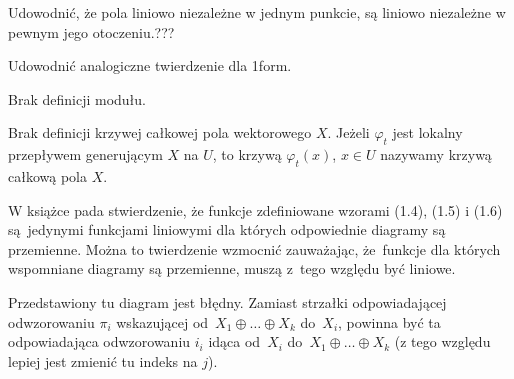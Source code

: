 \documentclass[a4paper,11pt]{article}
\begin{document}




\vspace{\spaceTwo} \vspace{\spaceThree}



\noi {} \Dok \start Udowodnić, że pola liniowo
niezależne w jednym punkcie, są liniowo niezależne w pewnym jego
otoczeniu.???

\vspace{\spaceFour}


\start Udowodnić analogiczne twierdzenie dla 1\dywiz form.

\vspace{\spaceFour}


\start Brak definicji modułu.

\vspace{\spaceFour}


\start Brak definicji krzywej całkowej pola wektorowego $X$. Jeżeli
$\varphi_{ t }$ jest lokalny przepływem generującym $X$ na $U$, to
krzywą $\varphi_{ t }( x )$, $x \in U$ nazywamy krzywą całkową pola
$X$.

\vspace{\spaceFour}


\start {} W książce pada stwierdzenie, że funkcje zdefiniowane
wzorami (1.4), (1.5) i (1.6) są~jedynymi funkcjami liniowymi dla
których odpowiednie diagramy są przemienne. Można to twierdzenie
wzmocnić zauważając, że~funkcje dla których wspomniane diagramy są
przemienne, muszą z~tego względu być liniowe.

\vspace{\spaceFour}


\start {} Przedstawiony tu diagram jest błędny. Zamiast strzałki
odpowiadającej odwzorowaniu $\pi_{ i }$ wskazującej
od~$X_{ 1 } \oplus \ldots \oplus X_{ k }$ do~$X_{ i }$, powinna być ta
odpowiadająca odwzorowaniu $i_{ i }$ idąca od~$X_{ i }$
do~$X_{ 1 } \oplus \ldots \oplus X_{ k }$ (z tego względu lepiej jest
zmienić tu indeks na $j$).

\vspace{\spaceFour}
\end{document}
